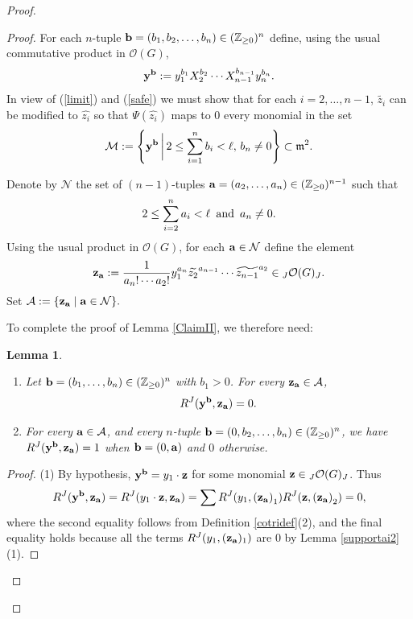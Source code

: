 \documentclass{amsart}
\numberwithin{equation}{section}
\newtheorem{lemma}[theorem]{Lemma}
\theoremstyle{definition}
\begin{document}
\begin{proof}
\begin{proof}
For each $n$-tuple ${\bf b}=(b_1, b_2,\dots,b_n) \in (\mathbb{Z}_{\geq 0})^n$ define, using the usual commutative product in $\mathcal{O}(G)$,
\begin{equation}\label{ydef} {\bf y}^{{\bf b}}:= y_1^{b_1}X_2^{b_2}\cdots X_{n-1}^{b_{n-1}}y_n^{b_n}.
\end{equation}
In view of (\ref{limit}) and (\ref{safe}) we must show that for each $i = 2, \ldots , n-1$, $\widetilde{z_i}$ can be modified to $\widehat{z_i}$  so that $\Psi(\widehat{z_i})$ maps to $0$ every monomial in the set 
\begin{equation}\label{setofmons}
\mathcal{M}:= \left\{ {\bf y}^{{\bf b}}\, \bigg |\, 2 \leq \sum_{i = 1}^n b_i < \ell, \, b_n \neq 0 \right\}\subset \mathfrak{m}^2.
\end{equation}

Denote by $\mathcal{N}$ the set of $(n-1)$-tuples ${\bf a}=(a_2,\dots,a_n)\in (\mathbb{Z}_{\geq 0})^{n-1}$ such that 
$$2 \leq \sum_{i = 2}^n a_i < \ell\,\,\,{\rm and}\,\,\,a_n \neq 0.$$ 
Using the usual product in $\mathcal{O}(G)$, for each ${\bf a} \in \mathcal{N}$ define the element 
$$ {\bf z}_{{\bf a}}:=\frac{1}{a_n!\cdots a_2!}y_1^{a_n}\widetilde{z_2}^{a_{n-1}}\cdots \widetilde{z_{n-1}}^{a_2}\in {}_J\mathcal{O}(G)_J.$$
Set $ \mathcal{A}:=\{{\bf z}_{\bf a} \mid {\bf a} \in \mathcal{N} \}.$

To complete the proof of Lemma \ref{ClaimII}, we therefore need:

\begin{lemma}\label{newlemma}
\begin{enumerate}
\item Let ${\bf b} = (b_1, \ldots , b_n) \in (\mathbb{Z}_{\geq 0})^{n}$ with $b_1 > 0$. For every ${\bf z}_{{\bf a}} \in \mathcal{A}$,
$$ R^J({\bf y}^{{\bf b}}, {\bf z}_{{\bf a}})=0.$$
\item For every ${\bf a}\in \mathcal{A}$, and every $n$-tuple ${\bf b} = (0,b_2, \ldots , b_n)\in (\mathbb{Z}_{\geq 0})^{n}$, we have  
$R^J({\bf y}^{{\bf b}},{\bf z}_{{\bf a}}) = 1$ when ${\bf b} = (0, {\bf a})$ and $0$ otherwise.
\end{enumerate}
\end{lemma}

\begin{proof}
(1) By hypothesis, ${\bf y}^{{\bf b}} = y_1 \cdot {\bf z}$ for some monomial ${\bf z} \in {}_J\mathcal{O}(G)_J$.
Thus
$$R^J({\bf y}^{{\bf b}}, {\bf z}_{{\bf a}})=R^J(y_1 \cdot {\bf z}, {\bf z}_{{\bf a}})= \sum R^J( y_1, \left({\bf z}_{{\bf a}}\right)_{1})R^J({\bf z}, \left({\bf z}_{{\bf a}}\right)_{2})=0,
$$
where the second equality follows from Definition \ref{cotridef}(2), and the final equality holds because all the terms  $R^J( y_1, ({\bf z}_{{\bf a}})_{1})$ are $0$ by Lemma \ref{supportai2}(1).


\end{proof}
\end{proof}
\end{proof}
\end{document}

